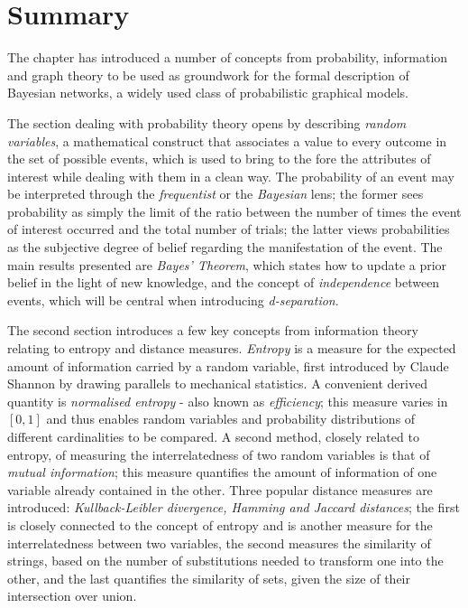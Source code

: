 \section{Summary}
The chapter has introduced a number of concepts from probability, information and graph theory to be used as groundwork for the formal description of Bayesian networks, a widely used class of probabilistic graphical models.

The section dealing with probability theory opens by describing \textit{random variables}, a mathematical construct that associates a value to every outcome in the set of possible events, which is used to bring to the fore the attributes of interest while dealing with them in a clean way.
The probability of an event may be interpreted through the \textit{frequentist} or the \textit{Bayesian} lens; the former sees probability as simply the limit of the ratio between the number of times the event of interest occurred and the total number of trials; the latter views probabilities as the subjective degree of belief regarding the manifestation of the event.
The main results presented are \textit{Bayes' Theorem}, which states how to update a prior belief in the light of new knowledge, and the concept of \textit{independence} between events, which will be central when introducing \textit{d-separation}.

The second section introduces a few key concepts from information theory relating to entropy and distance measures.
\textit{Entropy} is a measure for the expected amount of information carried by a random variable, first introduced by Claude Shannon by drawing parallels to mechanical statistics. 
A convenient derived quantity is \textit{normalised entropy} - also known as \textit{efficiency}; this measure varies in $[0,1]$ and thus enables random variables and probability distributions of different cardinalities to be compared.
A second method, closely related to entropy, of measuring the interrelatedness of two random variables is that of \textit{mutual information}; this measure quantifies the amount of information of one variable already contained in the other.
Three popular distance measures are introduced: \textit{Kullback-Leibler divergence, Hamming and Jaccard distances}; the first is closely connected to the concept of entropy and is another measure for the interrelatedness between two variables, the second measures the similarity of strings, based on the number of substitutions needed to transform one into the other, and the last quantifies the similarity of sets, given the size of their intersection over union.

